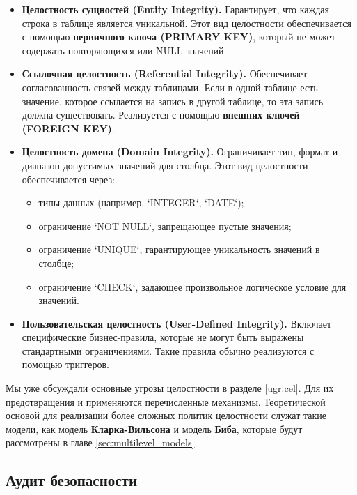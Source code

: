 \begin{itemize}
    \item \textbf{Целостность сущностей (Entity Integrity).} Гарантирует, что каждая строка в таблице является уникальной. Этот вид целостности обеспечивается с помощью \textbf{первичного ключа (PRIMARY KEY)}, который не может содержать повторяющихся или NULL-значений.
    
    \item \textbf{Ссылочная целостность (Referential Integrity).} Обеспечивает согласованность связей между таблицами. Если в одной таблице есть значение, которое ссылается на запись в другой таблице, то эта запись должна существовать. Реализуется с помощью \textbf{внешних ключей (FOREIGN KEY)}.
    
    \item \textbf{Целостность домена (Domain Integrity).} Ограничивает тип, формат и диапазон допустимых значений для столбца. Этот вид целостности обеспечивается через:
    \begin{itemize}
        \item типы данных (например, `INTEGER`, `DATE`);
        \item ограничение `NOT NULL`, запрещающее пустые значения;
        \item ограничение `UNIQUE`, гарантирующее уникальность значений в столбце;
        \item ограничение `CHECK`, задающее произвольное логическое условие для значений.
    \end{itemize}
    
    \item \textbf{Пользовательская целостность (User-Defined Integrity).} Включает специфические бизнес-правила, которые не могут быть выражены стандартными ограничениями. Такие правила обычно реализуются с помощью триггеров.
\end{itemize}

Мы уже обсуждали основные угрозы целостности в разделе \ref{ugr:cel}. Для их предотвращения и применяются перечисленные механизмы. Теоретической основой для реализации более сложных политик целостности служат такие модели, как модель \textbf{Кларка-Вильсона} и модель \textbf{Биба}, которые будут рассмотрены в главе \ref{sec:multilevel_models}.

\subsection{Аудит безопасности}

